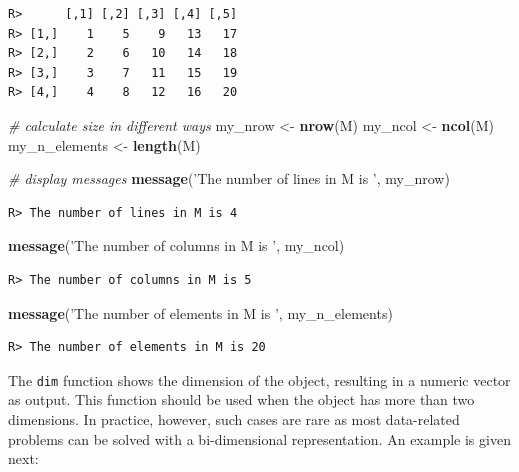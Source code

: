 \documentclass[
  12pt,
]{book}
\newenvironment{Shaded}{\begin{snugshade}}{\end{snugshade}}
\newcommand{\CommentTok}[1]{\textcolor[rgb]{0.37,0.37,0.37}{\textit{#1}}}
\newcommand{\KeywordTok}[1]{\textcolor[rgb]{0.27,0.27,0.27}{\textbf{#1}}}
\newcommand{\NormalTok}[1]{#1}
\newcommand{\StringTok}[1]{\textcolor[rgb]{0.5,0.5,0.5}{#1}}
\begin{document}
\begin{verbatim}
R>      [,1] [,2] [,3] [,4] [,5]
R> [1,]    1    5    9   13   17
R> [2,]    2    6   10   14   18
R> [3,]    3    7   11   15   19
R> [4,]    4    8   12   16   20
\end{verbatim}

\begin{Shaded}
\begin{Highlighting}[]
\CommentTok{# calculate size in different ways}
\NormalTok{my_nrow <-}\StringTok{ }\KeywordTok{nrow}\NormalTok{(M)}
\NormalTok{my_ncol <-}\StringTok{ }\KeywordTok{ncol}\NormalTok{(M)}
\NormalTok{my_n_elements <-}\StringTok{ }\KeywordTok{length}\NormalTok{(M)}

\CommentTok{# display messages}
\KeywordTok{message}\NormalTok{(}\StringTok{'The number of lines in M is '}\NormalTok{, my_nrow)}
\end{Highlighting}
\end{Shaded}

\begin{verbatim}
R> The number of lines in M is 4
\end{verbatim}

\begin{Shaded}
\begin{Highlighting}[]
\KeywordTok{message}\NormalTok{(}\StringTok{'The number of columns in M is '}\NormalTok{, my_ncol)}
\end{Highlighting}
\end{Shaded}

\begin{verbatim}
R> The number of columns in M is 5
\end{verbatim}

\begin{Shaded}
\begin{Highlighting}[]
\KeywordTok{message}\NormalTok{(}\StringTok{'The number of elements in M is '}\NormalTok{, my_n_elements)}
\end{Highlighting}
\end{Shaded}

\begin{verbatim}
R> The number of elements in M is 20
\end{verbatim}

The \texttt{dim} function shows the dimension of the object, resulting in a numeric vector as output. This function should be used when the object has more than two dimensions. In practice, however, such cases are rare as most data-related problems can be solved with a bi-dimensional representation. An example is given next:
\end{document}
